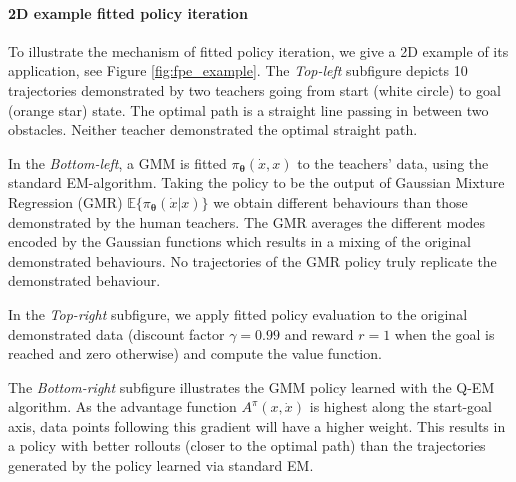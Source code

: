 \documentclass[final,3p,times,twocolumn]{elsarticle}
\newcommand{\X}{x}
\newcommand{\U}{\dot{x}}
\newcommand{\Param}{\boldsymbol{\theta}}
\begin{document}



\paragraph{2D example fitted policy iteration}

To illustrate the mechanism of fitted policy iteration, we give a 2D example 
of its application, see Figure \ref{fig:fpe_example}. The \textit{Top-left} subfigure
depicts 10 trajectories demonstrated by two teachers going from start (white circle) to goal (orange star) state. 
The optimal path is a straight line passing in between two obstacles. 
Neither teacher demonstrated the optimal straight path. 

In the \textit{Bottom-left}, a GMM is fitted $\pi_{\Param}(\U,\X)$ to the teachers' data, using the standard EM-algorithm.
Taking the policy to be the output of Gaussian Mixture Regression (GMR) $\mathbb{E}\{\pi_{\Param}(\U|\X)\}$ we obtain different
behaviours than those demonstrated by the human teachers. The GMR averages the different modes encoded by the Gaussian functions 
which results in a mixing of the original demonstrated behaviours. No trajectories of the GMR policy truly replicate 
the demonstrated behaviour. 

In the \textit{Top-right} subfigure, we apply fitted policy evaluation to the original demonstrated data (discount 
factor $\gamma=0.99$ and reward $r=1$ when the goal is reached and zero otherwise) and compute the value function.

The \textit{Bottom-right} subfigure illustrates the GMM policy learned with the Q-EM algorithm. As 
the advantage function $ A^{\pi}(\X,\U)$ is highest along the start-goal axis, data points
following this gradient will have a higher weight. This results in a policy with better 
rollouts (closer to the optimal path) than the trajectories generated by the policy learned via standard EM. 
\end{document}
